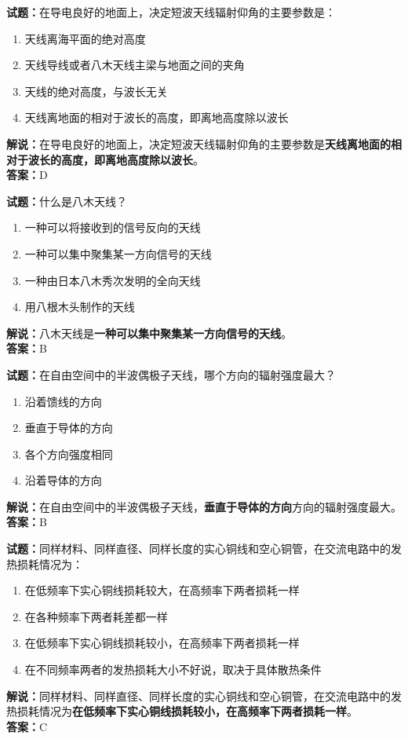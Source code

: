 \documentclass{ctexbook}
\begin{document}
\bigskip


\noindent\textbf{试题：}在导电良好的地面上，决定短波天线辐射仰角的主要参数是：
\begin{enumerate}[leftmargin=3em]
\item 天线离海平面的绝对高度
\item 天线导线或者八木天线主梁与地面之间的夹角
\item 天线的绝对高度，与波长无关
\item 天线离地面的相对于波长的高度，即离地高度除以波长
\end{enumerate}
\noindent\textbf{解说：}在导电良好的地面上，决定短波天线辐射仰角的主要参数是\textbf{天线离地面的相对于波长的高度，即离地高度除以波长}。\\\noindent\textbf{答案：}D


\bigskip


\noindent\textbf{试题：}什么是八木天线？
\begin{enumerate}[leftmargin=3em]
\item 一种可以将接收到的信号反向的天线
\item 一种可以集中聚集某一方向信号的天线
\item 一种由日本八木秀次发明的全向天线
\item 用八根木头制作的天线
\end{enumerate}
\noindent\textbf{解说：}八木天线是\textbf{一种可以集中聚集某一方向信号的天线}。\\\noindent\textbf{答案：}B




\bigskip


\noindent\textbf{试题：}在自由空间中的半波偶极子天线，哪个方向的辐射强度最大？
\begin{enumerate}[leftmargin=3em]
\item 沿着馈线的方向
\item 垂直于导体的方向
\item 各个方向强度相同
\item 沿着导体的方向
\end{enumerate}
\noindent\textbf{解说：}在自由空间中的半波偶极子天线，\textbf{垂直于导体的方向}方向的辐射强度最大。\\\noindent\textbf{答案：}B



\bigskip


\noindent\textbf{试题：}同样材料、同样直径、同样长度的实心铜线和空心铜管，在交流电路中的发热损耗情况为：
\begin{enumerate}[leftmargin=3em]
\item 在低频率下实心铜线损耗较大，在高频率下两者损耗一样
\item 在各种频率下两者耗差都一样
\item 在低频率下实心铜线损耗较小，在高频率下两者损耗一样
\item 在不同频率两者的发热损耗大小不好说，取决于具体散热条件
\end{enumerate}
\noindent\textbf{解说：}同样材料、同样直径、同样长度的实心铜线和空心铜管，在交流电路中的发热损耗情况为\textbf{在低频率下实心铜线损耗较小，在高频率下两者损耗一样}。\\\noindent\textbf{答案：}C
\end{document}
